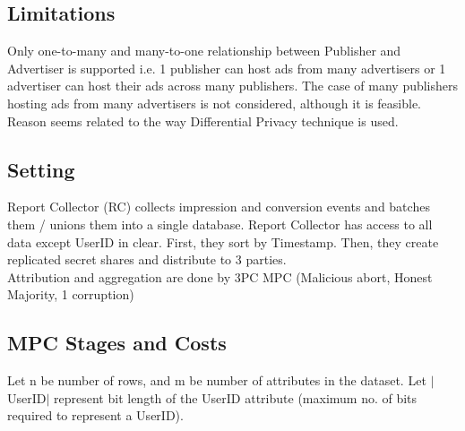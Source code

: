 \subsection{Limitations}
Only one-to-many and many-to-one relationship between Publisher and Advertiser is supported i.e. 1 publisher can host ads from many advertisers or 1 advertiser can host their ads across many publishers. The case of many publishers hosting ads from many advertisers is not considered, although it is feasible. Reason seems related to the way Differential Privacy technique is used.

\subsection{Setting}
Report Collector (RC) collects impression and conversion events and batches them / unions them into a single database. Report Collector has access to all data except UserID in clear. First, they sort by Timestamp. Then, they create replicated secret shares and distribute to 3 parties. \\

Attribution and aggregation are done by 3PC MPC (Malicious abort, Honest Majority, 1 corruption)

\subsection{MPC Stages and Costs}
Let n be number of rows, and m be number of attributes in the dataset. Let $|$UserID$|$ represent bit length of the UserID attribute (maximum no. of bits required to represent a UserID).

